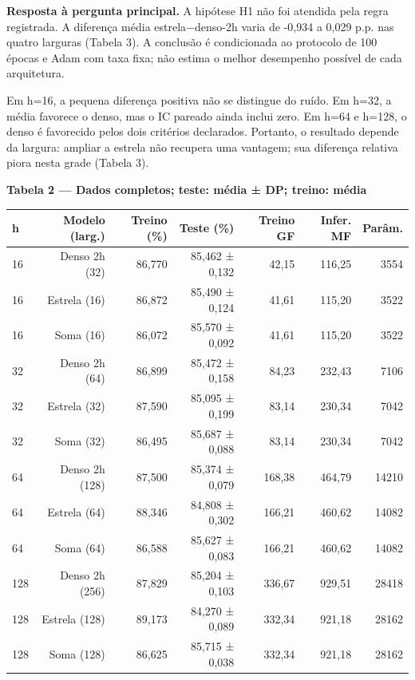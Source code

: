 \documentclass[10pt,a4paper]{article}
\begin{document}
\textbf{Resposta à pergunta principal.} A hipótese H1 não foi atendida pela regra registrada. A diferença média estrela−denso-2h varia de -0,934 a 0,029 p.p. nas quatro larguras (Tabela 3). A conclusão é condicionada ao protocolo de 100 épocas e Adam com taxa fixa; não estima o melhor desempenho possível de cada arquitetura.


Em h=16, a pequena diferença positiva não se distingue do ruído. Em h=32, a média favorece o denso, mas o IC pareado ainda inclui zero. Em h=64 e h=128, o denso é favorecido pelos dois critérios declarados. Portanto, o resultado depende da largura: ampliar a estrela não recupera uma vantagem; sua diferença relativa piora nesta grade (Tabela 3).


\noindent\textbf{Tabela 2 — Dados completos; teste: média ± DP; treino: média}

{\footnotesize\setlength{\tabcolsep}{4pt}\begin{center}\begin{tabular}{lrrrrrr}\toprule
h & Modelo (larg.) & Treino (\%) & Teste (\%) & Treino GF & Infer. MF & Parâm.\\\midrule
16 & Denso 2h (32) & 86,770 & 85,462 ± 0,132 & 42,15 & 116,25 & 3554\\
16 & Estrela (16) & 86,872 & 85,490 ± 0,124 & 41,61 & 115,20 & 3522\\
16 & Soma (16) & 86,072 & 85,570 ± 0,092 & 41,61 & 115,20 & 3522\\
32 & Denso 2h (64) & 86,899 & 85,472 ± 0,158 & 84,23 & 232,43 & 7106\\
32 & Estrela (32) & 87,590 & 85,095 ± 0,199 & 83,14 & 230,34 & 7042\\
32 & Soma (32) & 86,495 & 85,687 ± 0,088 & 83,14 & 230,34 & 7042\\
64 & Denso 2h (128) & 87,500 & 85,374 ± 0,079 & 168,38 & 464,79 & 14210\\
64 & Estrela (64) & 88,346 & 84,808 ± 0,302 & 166,21 & 460,62 & 14082\\
64 & Soma (64) & 86,588 & 85,627 ± 0,083 & 166,21 & 460,62 & 14082\\
128 & Denso 2h (256) & 87,829 & 85,204 ± 0,103 & 336,67 & 929,51 & 28418\\
128 & Estrela (128) & 89,173 & 84,270 ± 0,089 & 332,34 & 921,18 & 28162\\
128 & Soma (128) & 86,625 & 85,715 ± 0,038 & 332,34 & 921,18 & 28162\\
\bottomrule\end{tabular}\end{center}}
\end{document}
